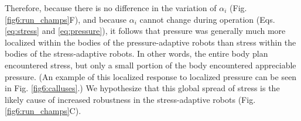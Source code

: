 Therefore, because there is no difference in the variation of $\alpha_i$ (Fig. \ref{fig6:run_champs}F), and because  $\alpha_i$ cannot change during operation (Eqs. \ref{eq:stress} and \ref{eq:pressure}), it follows that pressure was generally much more localized within
the bodies of the pressure-adaptive robots than stress within the bodies of the stress-adaptive robots.
In other words, the entire body plan encountered stress, but only a small portion of the body encountered appreciable pressure.
(An example of this localized response to localized pressure can be seen in Fig. \ref{fig6:calluses}.)
We hypothesize that this global spread of stress is the likely cause of increased robustness in the stress-adaptive robots
(Fig. \ref{fig6:run_champs}C).








